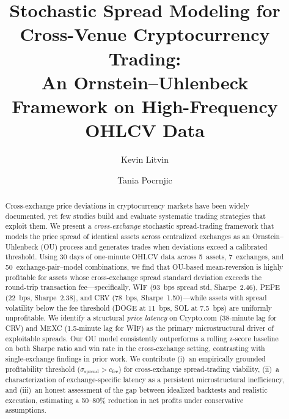 \documentclass[sigconf,nonacm=false]{acmart}
\begin{document}
\title{Stochastic Spread Modeling for Cross-Venue Cryptocurrency Trading:\\An Ornstein--Uhlenbeck Framework on High-Frequency OHLCV Data}

\author{Kevin Litvin}

\author{Tania Pocrnjic}

\begin{abstract}
Cross-exchange price deviations in cryptocurrency markets have been widely documented, yet few studies build and evaluate systematic trading strategies that exploit them. We present a \emph{cross-exchange} stochastic spread-trading framework that models the price spread of identical assets across centralized exchanges as an Ornstein--Uhlenbeck (OU) process and generates trades when deviations exceed a calibrated threshold. Using 30 days of one-minute OHLCV data across 5~assets, 7~exchanges, and 50~exchange-pair--model combinations, we find that OU-based mean-reversion is highly profitable for assets whose cross-exchange spread standard deviation exceeds the round-trip transaction fee---specifically, WIF (93~bps spread std, Sharpe~2.46), PEPE (22~bps, Sharpe~2.38), and CRV (78~bps, Sharpe~1.50)---while assets with spread volatility below the fee threshold (DOGE at 11~bps, SOL at 7.5~bps) are uniformly unprofitable. We identify a structural \emph{price latency} on Crypto.com (38-minute lag for CRV) and MEXC (1.5-minute lag for WIF) as the primary microstructural driver of exploitable spreads. Our OU model consistently outperforms a rolling z-score baseline on both Sharpe ratio and win rate in the cross-exchange setting, contrasting with single-exchange findings in prior work. We contribute (i)~an empirically grounded profitability threshold ($\sigma_{\text{spread}} > c_{\text{fee}}$) for cross-exchange spread-trading viability, (ii)~a characterization of exchange-specific latency as a persistent microstructural inefficiency, and (iii)~an honest assessment of the gap between idealized backtests and realistic execution, estimating a 50--80\% reduction in net profits under conservative assumptions.
\end{abstract}
\end{document}
